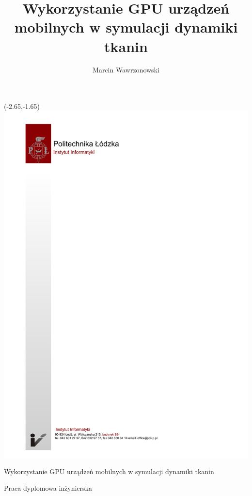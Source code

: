 \documentclass[12pt, oneside, a4paper]{mwbk}
\begin{document}
\author{Marcin Wawrzonowski}
\title{Wykorzystanie GPU urządzeń mobilnych w symulacji dynamiki tkanin}
\begin{titlepage}
\thispagestyle{empty}
\begin{textblock}{1}(-2.65,-1.65)
\includegraphics{figures/tytulowa_pusta_mgrinz.pdf}
\end{textblock}
\vspace{7.3cm}
\begin{center}
\selectfont
\Huge
Wykorzystanie GPU urządzeń mobilnych w symulacji dynamiki tkanin
\end{center}
\begin{center}
\selectfont
Praca dyplomowa inżynierska
\end{center}
\vspace{7.9cm}
\begin{center}

\end{center}
\end{titlepage}
\end{document}
